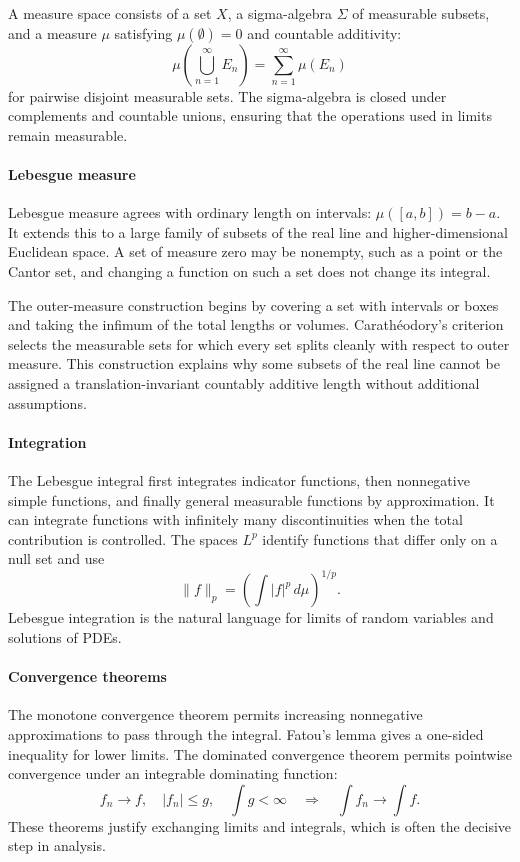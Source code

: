 A measure space consists of a set $X$, a sigma-algebra $\Sigma$ of measurable subsets, and a measure $\mu$ satisfying $\mu(\emptyset)=0$ and countable additivity:
\[
\mu\left(\bigcup_{n=1}^{\infty}E_n\right)=\sum_{n=1}^{\infty}\mu(E_n)
\]
for pairwise disjoint measurable sets. The sigma-algebra is closed under complements and countable unions, ensuring that the operations used in limits remain measurable.

\paragraph{Lebesgue measure}
Lebesgue measure agrees with ordinary length on intervals: $\mu([a,b])=b-a$. It extends this to a large family of subsets of the real line and higher-dimensional Euclidean space. A set of measure zero may be nonempty, such as a point or the Cantor set, and changing a function on such a set does not change its integral.

The outer-measure construction begins by covering a set with intervals or boxes and taking the infimum of the total lengths or volumes. Carath\'eodory's criterion selects the measurable sets for which every set splits cleanly with respect to outer measure. This construction explains why some subsets of the real line cannot be assigned a translation-invariant countably additive length without additional assumptions.

\paragraph{Integration}
The Lebesgue integral first integrates indicator functions, then nonnegative simple functions, and finally general measurable functions by approximation. It can integrate functions with infinitely many discontinuities when the total contribution is controlled. The spaces $L^p$ identify functions that differ only on a null set and use
\[
\|f\|_p=\left(\int |f|^p\,d\mu\right)^{1/p}.
\]
Lebesgue integration is the natural language for limits of random variables and solutions of PDEs.

\paragraph{Convergence theorems}
The monotone convergence theorem permits increasing nonnegative approximations to pass through the integral. Fatou's lemma gives a one-sided inequality for lower limits. The dominated convergence theorem permits pointwise convergence under an integrable dominating function:
\[
f_n\to f,\quad |f_n|\leq g,\quad \int g<\infty
\quad\Longrightarrow\quad
\int f_n\to\int f.
\]
These theorems justify exchanging limits and integrals, which is often the decisive step in analysis.

